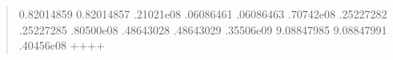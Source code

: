 \documentclass[letterpaper,10pt,english]{sphinxmanual}
\begin{document}
\begin{enumerate}
\begin{quote}
\begin{sphinxVerbatim}[commandchars=\\\{\}]
    \PYGZhy{}0.82014859          \PYGZhy{}0.82014857  .21021e\PYGZhy{}08 
     .06086461           .06086463  .70742e\PYGZhy{}08 
     .25227282           .25227285  .80500e\PYGZhy{}08 
     .48643028           .48643029  .35506e\PYGZhy{}09 
    \PYGZhy{}9.08847985          \PYGZhy{}9.08847991  .40456e\PYGZhy{}08 
+\PYGZhy{}\PYGZhy{}\PYGZhy{}\PYGZhy{}\PYGZhy{}\PYGZhy{}\PYGZhy{}\PYGZhy{}\PYGZhy{}\PYGZhy{}\PYGZhy{}\PYGZhy{}\PYGZhy{}\PYGZhy{}\PYGZhy{}\PYGZhy{}+\PYGZhy{}\PYGZhy{}\PYGZhy{}\PYGZhy{}\PYGZhy{}\PYGZhy{}\PYGZhy{}\PYGZhy{}\PYGZhy{}\PYGZhy{}\PYGZhy{}\PYGZhy{}\PYGZhy{}\PYGZhy{}\PYGZhy{}\PYGZhy{}\PYGZhy{}\PYGZhy{}\PYGZhy{}\PYGZhy{}\PYGZhy{}+\PYGZhy{}\PYGZhy{}\PYGZhy{}\PYGZhy{}\PYGZhy{}\PYGZhy{}\PYGZhy{}\PYGZhy{}\PYGZhy{}\PYGZhy{}\PYGZhy{}\PYGZhy{}\PYGZhy{}+
\end{sphinxVerbatim}
\end{quote}

\end{enumerate}
\end{document}
